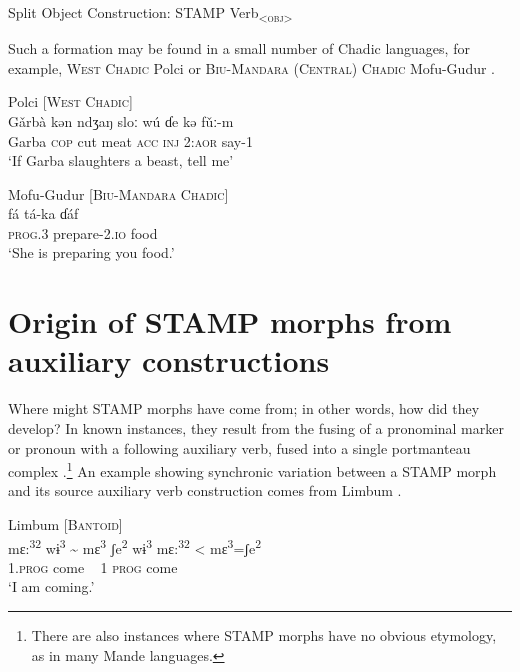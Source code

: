 \documentclass[output=paper]{langsci/langscibook}
\begin{document}
\ea\label{ex:anderson:30}
Split Object Construction:   STAMP  Verb\textsc{\textsubscript{<obj>}}
\z

Such a formation may be found in a small number of Chadic languages, for example, \textsc{West Chadic} Polci  or \textsc{Biu-Mandara (Central) Chadic} Mofu-Gudur . 

\ea\label{ex:anderson:31}
Polci \citep[153]{Caron2008}          \textsc{[West Chadic]}\\
\gll Gǎrbà   kən  ndʒaŋ  sloː  wú  ɗe  kə   fǔː-m \\
Garba  \textsc{cop}  cut  meat  \textsc{acc}  \textsc{inj}  \textsc{2:aor}  say-1  \\
\glt `If Garba slaughters a beast, tell me'
\z

\ea\label{ex:anderson:32}
Mofu-Gudur \citep[4]{Pohlig1992}          \textsc{[Biu-Mandara Chadic]}\\
\gll fá    tá-ka    ɗáf      \\
\textsc{prog.3}  prepare-2\textsc{.io}  food    \\
\glt `She is preparing you food.'
\z

\section{Origin of STAMP morphs from auxiliary constructions}\label{sec:Anderson:5}

Where might STAMP morphs have come from; in other words, how did they develop? In known instances, they result from the fusing of a pronominal marker or pronoun with a following auxiliary verb, fused into a single portmanteau complex \citep{Anderson2006, Anderson2011}.\footnote{There are also instances where STAMP morphs have no obvious etymology, as in many Mande languages.} An example showing synchronic variation between a STAMP morph and its source auxiliary verb construction comes from Limbum .

\ea\label{ex:anderson:33}
Limbum \citep[Limbum 3-4]{FiorePeck1973/1980}      \textsc{[Bantoid]}\\
\gll mɛ:\textsuperscript{32}  wɨ\textsuperscript{3}   {\textasciitilde}   mɛ\textsuperscript{3}  ʃe\textsuperscript{2}  wɨ\textsuperscript{3 }   mɛ:\textsuperscript{32} < mɛ\textsuperscript{3}=ʃe\textsuperscript{2}\\
\textsc{1.prog}  come  ~  1  \textsc{prog}  come\\
\glt `I am coming.'
\z
{}
\end{document}
